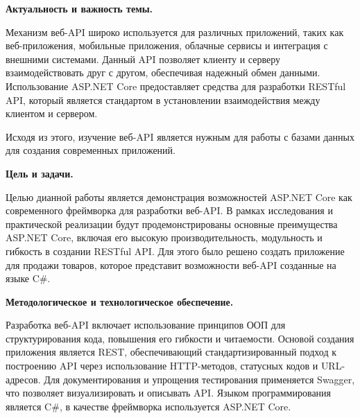 \documentclass[a4paper,12pt]{report}
\begin{document}


\clearpage
\tableofcontents

\clearpage
{}
\begin{acronym}[JPEG]
    \acro{}{}
\end{acronym}




\textbf{Актуальность и важность темы.}

Механизм веб-\acs{API} широко используется для различных приложений, таких как веб-приложения, мобильные приложения, 
облачные сервисы и интеграция с внешними системами. Данный API позволяет клиенту и серверу взаимодействовать друг с другом, 
обеспечивая надежный обмен данными. Использование ASP.NET Core предоставляет средства для разработки RESTful API, 
который является стандартом в установлении взаимодействия между клиентом и сервером.

Исходя из этого, изучение веб-\acs{API} является нужным для работы с базами данных для создания современных приложений.

\textbf{Цель и задачи.}

Целью дианной работы является демонстрация возможностей ASP.NET Core как современного фреймворка для разработки веб-\acs{API}. 
В рамках исследования и практической реализации будут продемонстрированы основные преимущества ASP.NET Core, включая его 
высокую производительность, модульность и гибкость в создании \acs{REST}ful \acs{API}. Для этого было решено создать приложение для 
продажи товаров, которое представит возможности веб-\acs{API} созданные на языке C\#.

\textbf{Методологическое и технологическое обеспечение.}

Разработка веб-\acs{API} включает использование принципов \acs{ООП} для структурирования кода, повышения его гибкости и читаемости. 
Основой создания приложения является \ac{REST}, обеспечивающий стандартизированный подход к построению \acs{API} через использование 
\acs{HTTP}-методов, статусных кодов и \acs{URL}-адресов. Для документирования и упрощения тестирования применяется Swagger, что позволяет 
визуализировать и описывать \acs{API}. Языком программирования является C\#, в качестве фреймворка используется ASP.NET Core.
\end{document}
